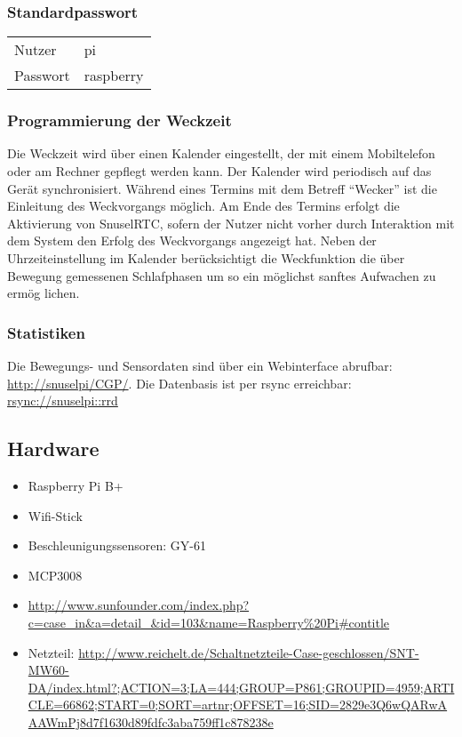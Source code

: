 \documentclass[a4paper,twoside,titlepage,normalheadings,tocleft,bibtotoc]{scrartcl}
\begin{document}
\subsubsection{Standardpasswort}
\begin{tabular}{ll}
Nutzer & pi \\
Passwort & raspberry \\
\end{tabular}

\subsubsection{Programmierung der Weckzeit}

Die Weckzeit wird über einen Kalender eingestellt, der mit einem Mobiltelefon
oder am Rechner gepflegt werden kann. Der Kalender wird periodisch auf das
Gerät synchronisiert. Während eines Termins mit dem Betreff "`Wecker"' ist die
Einleitung des Weckvorgangs möglich. Am Ende des Termins erfolgt die
Aktivierung von SnuselRTC, sofern der Nutzer nicht vorher durch Interaktion mit
dem System den Erfolg des Weckvorgangs angezeigt hat. Neben der
Uhrzeiteinstellung im Kalender berücksichtigt die Weckfunktion die über
Bewegung gemessenen Schlafphasen um so ein möglichst sanftes Aufwachen zu ermög
lichen. 

\subsubsection{Statistiken}
Die Bewegungs- und Sensordaten sind über ein Webinterface abrufbar: \url{http://snuselpi/CGP/}.
Die Datenbasis ist per rsync erreichbar: \url{rsync://snuselpi::rrd}


\subsection{Hardware}

\begin{itemize}
\item Raspberry Pi B+
\item Wifi-Stick
\item Beschleunigungssensoren:  GY-61
\item MCP3008
\item \url{http://www.sunfounder.com/index.php?c=case_in&a=detail_&id=103&name=Raspberry%20Pi#contitle}
\item Netzteil: \url{http://www.reichelt.de/Schaltnetzteile-Case-geschlossen/SNT-MW60-DA/index.html?;ACTION=3;LA=444;GROUP=P861;GROUPID=4959;ARTICLE=66862;START=0;SORT=artnr;OFFSET=16;SID=2829e3Q6wQARwAAAWmPj8d7f1630d89fdfc3aba759ff1c878238e}
\end{itemize}
\end{document}
